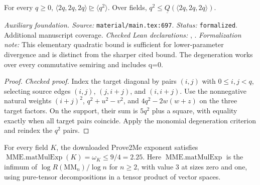 \renewcommand{\thetheorem}{A79}
\begin{lemma}
\label{aux:quadratic-matrix-subrank}
\leanok
For every $q\ge0$, $\langle2q,2q,2q\rangle\trianglerighteq\langle q^2\rangle$. Over fields, $q^2\le\underline Q(\langle2q,2q,2q\rangle)$.
\end{lemma}

\noindent\textit{Auxiliary foundation. Source:} \texttt{material/main.tex:697}.
\textit{Status:} \texttt{formalized}. Additional manuscript coverage.
\textit{Checked Lean declarations:} , .
\textit{Formalization note:} This elementary quadratic bound is sufficient for lower-parameter divergence and is distinct from the sharper cited bound. The degeneration works over every commutative semiring and includes q=0.

\begin{proof}
\leanok
{}
\textit{Checked proof.} Index the target diagonal by pairs $(i,j)$ with $0\le i,j<q$, selecting source edges $(i,j)$, $(j,i+j)$, and $(i,i+j)$. Use the nonnegative natural weights $(i+j)^2$, $q^2+u^2-v^2$, and $4q^2-2w(w+z)$ on the three target factors. On the support, their sum is $5q^2$ plus a square, with equality exactly when all target pairs coincide. Apply the monomial degeneration criterion and reindex the $q^2$ pairs.
\end{proof}

\renewcommand{\thetheorem}{A80}
\begin{theorem}
\label{aux:prove2me-statement}
\leanok
{}
For every field $K$, the downloaded Prove2Me exponent satisfies $\operatorname{MME.matMulExp}(K)=\omega_K\le 9/4=2.25$. Here $\operatorname{MME.matMulExp}$ is the infimum of $\log R(\mathrm{MM}_n)/\log n$ for $n\ge2$, with value $3$ at sizes zero and one, using pure-tensor decompositions in a tensor product of vector spaces.
\end{theorem}

